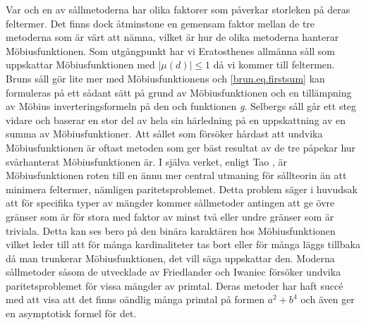 Var och en av sållmetoderna har olika faktorer som påverkar storleken på deras feltermer.
Det finns dock åtminstone en gemensam faktor mellan de tre metoderna som är värt att nämna, vilket är hur de olika metoderna hanterar Möbiusfunktionen.
Som utgångpunkt har vi Eratosthenes allmänna såll som uppskattar Möbiusfunktionen med \(|\mu(d)| \leq 1\) då vi kommer till feltermen.
Bruns såll  gör lite mer med Möbiusfunktionens och \eqref{brun.eq.firstsum} kan formuleras på ett sådant sätt på grund av Möbiusfunktionen och en tillämpning av Möbius inverteringsformeln på den och funktionen \textit{g}.
Selbergs såll går ett steg vidare och baserar en stor del av hela sin härledning på en uppskattning av en summa av Möbiusfunktioner.
Att sållet som försöker hårdast att undvika Möbiusfunktionen är oftast metoden som ger bäst resultat av de tre påpekar hur svårhanterat Möbiusfunktionen är.
I själva verket, enligt Tao \cite{Tao}, är Möbiusfunktionen roten till en ännu mer central utmaning för sållteorin än att minimera feltermer, nämligen paritetsproblemet.
Detta problem säger i huvudsak att för specifika typer av mängder kommer sållmetoder antingen att ge övre gränser som är för stora med faktor av minst två eller undre gränser som är triviala.
Detta kan ses bero på den binära karaktären hos Möbiusfunktionen vilket leder till att för många kardinaliteter tas bort eller för många läggs tillbaka då man trunkerar Möbiusfunktionen, det vill säga uppskattar den.
Moderna sållmetoder såsom de utvecklade av Friedlander och Iwaniec \cite{abPrimes} försöker undvika paritetsproblemet för vissa mängder av primtal.
Deras metoder har haft succé med att visa att det finns oändlig många primtal på formen \(a^2+b^4\) och även ger en asymptotisk formel för det.


